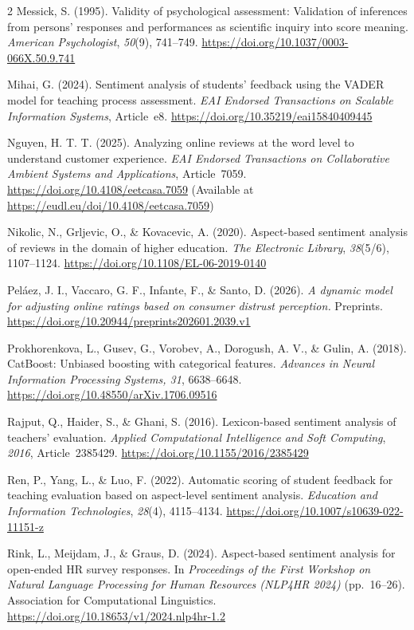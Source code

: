 \documentclass{article}
\begin{document}
\begin{multicols*}{2}
Messick, S. (1995). Validity of psychological assessment: Validation of inferences from persons' responses and performances as scientific inquiry into score meaning. \textit{American Psychologist}, \textit{50}(9), 741--749. \url{https://doi.org/10.1037/0003-066X.50.9.741}

Mihai, G. (2024). Sentiment analysis of students' feedback using the VADER model for teaching process assessment. \textit{EAI Endorsed Transactions on Scalable Information Systems}, Article~e8. \url{https://doi.org/10.35219/eai15840409445}

Nguyen, H. T. T. (2025). Analyzing online reviews at the word level to understand customer experience. \textit{EAI Endorsed Transactions on Collaborative Ambient Systems and Applications}, Article~7059. \url{https://doi.org/10.4108/eetcasa.7059} (Available at \url{https://eudl.eu/doi/10.4108/eetcasa.7059})

Nikolic, N., Grljevic, O., \& Kovacevic, A. (2020). Aspect-based sentiment analysis of reviews in the domain of higher education. \textit{The Electronic Library}, \textit{38}(5/6), 1107--1124. \url{https://doi.org/10.1108/EL-06-2019-0140}

Pel\'{a}ez, J. I., Vaccaro, G. F., Infante, F., \& Santo, D. (2026). \textit{A dynamic model for adjusting online ratings based on consumer distrust perception.} Preprints. \url{https://doi.org/10.20944/preprints202601.2039.v1}

Prokhorenkova, L., Gusev, G., Vorobev, A., Dorogush, A. V., \& Gulin, A. (2018). CatBoost: Unbiased boosting with categorical features. \textit{Advances in Neural Information Processing Systems, 31}, 6638--6648. \url{https://doi.org/10.48550/arXiv.1706.09516}

Rajput, Q., Haider, S., \& Ghani, S. (2016). Lexicon-based sentiment analysis of teachers’ evaluation. \textit{Applied Computational Intelligence and Soft Computing}, \textit{2016}, Article~2385429. \url{https://doi.org/10.1155/2016/2385429}

Ren, P., Yang, L., \& Luo, F. (2022). Automatic scoring of student feedback for teaching evaluation based on aspect-level sentiment analysis. \textit{Education and Information Technologies}, \textit{28}(4), 4115--4134. \url{https://doi.org/10.1007/s10639-022-11151-z}

Rink, L., Meijdam, J., \& Graus, D. (2024). Aspect-based sentiment analysis for open-ended HR survey responses. In \textit{Proceedings of the First Workshop on Natural Language Processing for Human Resources (NLP4HR 2024)} (pp.~16--26). Association for Computational Linguistics. \url{https://doi.org/10.18653/v1/2024.nlp4hr-1.2}


\end{multicols*}
\end{document}

